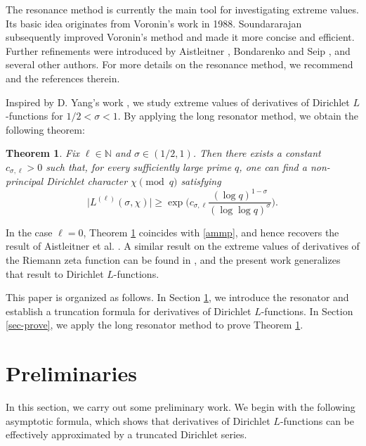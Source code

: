 \documentclass[12pt,reqno]{amsart}
\newtheorem{thm}{Theorem}[section]
\theoremstyle{definition}
\numberwithin{equation}{section}
\newcommand{\bg}{\big}
\newcommand{\bgg}{\bigg}
\newcommand{\mbn}{\mathbb{N}}
\begin{document}
\par
The resonance method is currently the main tool for investigating extreme values. Its basic idea originates from Voronin’s work \cite{voronin1988lower} in 1988. Soundararajan \cite{soundararajan2008extreme} subsequently improved Voronin’s method and made it more concise and efficient. Further refinements were introduced by Aistleitner \cite{aistleitner2016lower}, Bondarenko and Seip \cite{bondarenko2017Duke,bondarenko2018MathAnn}, and several other authors. For more details on the resonance method, we recommend \cite{aistleitner2019IMRN,chirre2019extreme,YANG2026jnt} and the references therein.
\par
Inspired by D. Yang's work \cite{yang2024BLMS}, we study extreme values of derivatives of Dirichlet \(L\)-functions for \(1/2<\sigma<1\). By applying the long resonator method, we obtain the following theorem:

\begin{thm}
\label{thm1}
    Fix \(\ell \in \mbn\) and \(\sigma \in (1/2,1)\). Then there exists a constant $c_{\sigma,\ell}>0$ such that, for every sufficiently large prime $q$, one can find a non-principal Dirichlet character $\chi \pmod q$ satisfying
    \[
    \bg| L^{(\ell)}(\sigma,\chi) \bg| \ge \exp \bgg(c_{\sigma,\ell} \frac{(\log q)^{1-\sigma}}{(\log\log q)^{\sigma}} \bgg).
    \]
\end{thm}

\par
In the case \(\ell=0\), Theorem \ref{thm1} coincides with \eqref{ammp}, and hence recovers the result of Aistleitner et al. \cite{Aistleitner2019QJMath}. A similar result on the extreme values of derivatives of the Riemann zeta function can be found in \cite[Theorem 2(B)]{yang2022extreme}, and the present work generalizes that result to Dirichlet \(L\)-functions.
\par
This paper is organized as follows. In Section \ref{sec-pre}, we introduce the resonator and establish a truncation formula for derivatives of Dirichlet \(L\)-functions. In Section \ref{sec-prove}, we apply the long resonator method to prove Theorem \ref{thm1}.

\section{Preliminaries}
\label{sec-pre}
In this section, we carry out some preliminary work. We begin with the following asymptotic formula, which shows that derivatives of Dirichlet \(L\)-functions can be effectively approximated by a truncated Dirichlet series.
\end{document}
